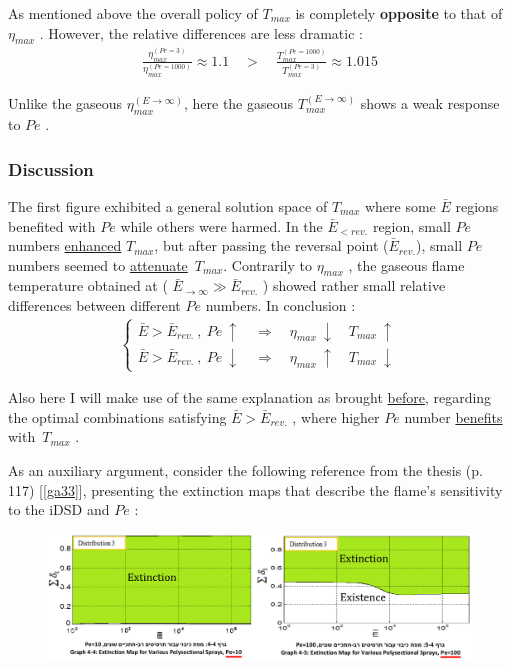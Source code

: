 \documentclass[12pt]{article}
\numberwithin{equation}{section}
\begin{document}
\begin{flushleft}
As mentioned above the overall policy of $T_{max}$ is completely \textbf{opposite} to that of $\eta_{max}$ . However, the relative differences are less dramatic :
\begin{align*}
\frac{\eta_{max}^{(Pe=3)}}{\eta_{max}^{(Pe=1000)}} \approx 1.1 \quad > \quad \frac{T_{max}^{(Pe=1000)}}{T_{max}^{(Pe=3)}} \approx 1.015
\end{align*}

Unlike the gaseous $\eta_{max}^{(E \rightarrow \infty)}$, here the gaseous $T_{max}^{(E \rightarrow \infty)}$ shows a weak response to $Pe$ .

\subsubsection{Discussion}
The first figure exhibited a general solution space of $T_{max}$ where some $\bar{E}$ regions benefited with $Pe$ while others were harmed. In the $\bar{E}_{< rev.}$ region, small $Pe$ numbers \underline{enhanced} $T_{max}$, but after passing the reversal point ($\bar{E}_{rev.}$), small $Pe$ numbers seemed to \underline{attenuate} \,$T_{max}$. Contrarily to $\eta_{max}$ , the gaseous flame temperature obtained at ( $\bar{E}_{\rightarrow \infty} \gg \bar{E}_{rev.}$ ) showed rather small relative differences between different $Pe$ numbers. In conclusion :
\begin{align*}
\begin{cases}
\bar{E} > \bar{E}_{rev.} \ , \ Pe \ \uparrow \quad \Rightarrow \quad \eta_{max} \ \downarrow \quad T_{max} \ \uparrow \\
\bar{E} > \bar{E}_{rev.} \ , \ Pe \ \downarrow \quad \Rightarrow \quad \eta_{max} \ \uparrow \quad T_{max} \ \downarrow
\end{cases} 
\end{align*}

Also here I will make use of the same explanation as brought \hyperref[opt_question]{before}, regarding the optimal combinations satisfying $\bar{E} > \bar{E}_{rev.}$ , where higher $Pe$ number \underline{benefits} with \,$T_{max}$ . 

As an auxiliary argument, consider the following reference from the thesis (p. 117) [\ref{ga33}], presenting the extinction maps that describe the flame's sensitivity to the iDSD and $Pe$ : \vspace{4mm}

\begin{figure}[H]
\centering
\includegraphics[width=1.2 \linewidth, center]{extinction.png}
\end{figure}


\end{flushleft}
\end{document}
